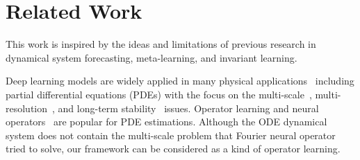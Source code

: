 \section{Related Work}
\label{sec:related_work}
\vspace{-0.05cm}
This work is inspired by the ideas and limitations of previous research in dynamical system forecasting, meta-learning, and invariant learning.


Deep learning models are widely applied in many physical applications~\citep{lusch2018deep,yeo2019deep,kochkov2021machine,chen2018neural} including partial differential equations (PDEs) with the focus on the multi-scale~\citep{li2020fourier,stachenfeld2021learned}, multi-resolution~\citep{kochkov2021machine,wu2022learning}, and long-term stability~\citep{li2021learning,lippe2023pde} issues. 
Operator learning and neural operators~\citep{gupta2021multiwavelet,kovachki2023neural} are popular for PDE estimations. Although the ODE dynamical system does not contain the multi-scale problem that Fourier neural operator~\citep{kovachki2023neural} tried to solve, our framework can be considered as a kind of operator learning. 




